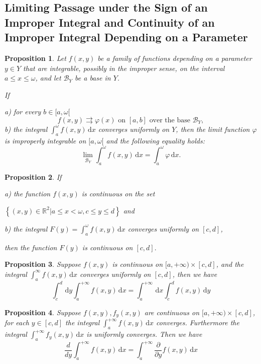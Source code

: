 \documentclass[a4paper,12pt]{article}
\newtheorem{proposition}{Proposition}
\begin{document}
\begin{CJK}{UTF8}{gbsn}
    \section{Limiting Passage under the Sign of an Improper Integral and 
    Continuity of an Improper Integral Depending on a Parameter}
    \begin{proposition}
        Let $f(x,y)$ be a family of functions depending on a parameter $y \in Y$ that 
        are integrable, possibly in the improper sense, on the interval $a \le x \le 
        \omega$, and let $\mathcal{B}_Y$ be a base in $Y$.
        
        If 

        a) for every $b \in [a,\omega[$ 
        \[
            f(x,y)\rightrightarrows \varphi(x) \text{ on } [a,b]
            \text{ over the base } \mathcal{B}_Y,
            \]
        b) the integral $\displaystyle \int_a^{\omega}f(x,y)\,\mathrm{d}x$
        converges uniformly on $Y$,
        then the limit function $\varphi$is improperly integrable on $[a,\omega[$
        and the following equality holds:
        \[
            \lim_{\mathcal{B}_Y}\int_a^{\omega}f(x,y)\, \mathrm{d}x = \int_a^{\omega}\varphi 
            \, \mathrm{d}x.
            \]
    \end{proposition}

    \begin{proposition}
        If 

        a) the function $f(x,y)$ is continuous on the set 

        $\displaystyle \left\{
            (x,y) \in \mathbb{R}^2 \vert a \le x <\omega, c \le y \le d \right\}$
        and 

        b) the integral $F(y) = \int_a^{\omega}f(x,y)\, \mathrm{d}x$ converges 
        uniformly on $[c,d]$,

        then the function $F(y)$ is continuous on $[c,d].$
    \end{proposition}

    \begin{proposition}
        Suppose $f(x,y)$ is continuous on $[a,+\infty) \times [c,d]$, and 
        the integral $\int_a^{\infty}f(x,y)\, \mathrm{d}x$ converges uniformly on 
        $[c,d]$, then we have 
        \[
            \int_c^d\,\mathrm{d}y\int_a^{+\infty}f(x,y)\, \mathrm{d}x = 
            \int_a^{+\infty}\,\mathrm{d}x\int_c^df(x,y)\,\mathrm{d}y
            \]
    \end{proposition}

    \begin{proposition}
        Suppose $f(x,y), f_y(x,y)$ are continuous on $[a,+\infty)\times[c,d]$, 
        for each $y \in [c,d]$ the integral $\int_a^{+\infty}f(x,y)\, \mathrm{d}x$ 
        converges. Furthermore the integral $\int_a^{+\infty}f_y(x,y)\,\mathrm{d}x$
        is uniformly converges. Then we have 
        \[
            \frac{d}{dy}\int_a^{+\infty}f(x,y)\,\mathrm{d}x = 
            \int_a^{+\infty}\frac{\partial}{\partial y}f(x,y)\,\mathrm{d}x
            \]
    \end{proposition}


\end{CJK}
\end{document}
